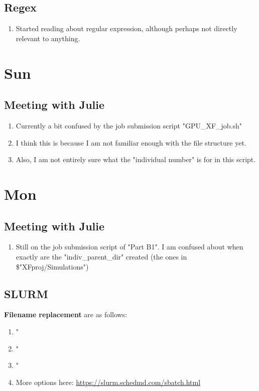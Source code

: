 \documentclass[12pt,letterpaper]{article}
\begin{document}
\subsection{Regex}
\begin{enumerate}
  \item Started reading about regular expression, although perhaps not directly relevant
    to anything.
\end{enumerate}

\section{Sun}
\subsection{Meeting with Julie}
\begin{enumerate}
  \item Currently a bit confused by the job submission script "GPU_XF_job.sh"
  \item I think this is because I am not familiar enough with the file structure yet.
  \item Also, I am not entirely sure what the "individual number" is for in this script.
\end{enumerate}

\section{Mon}
\subsection{Meeting with Julie}
\label{65S1}
\begin{enumerate}
  \item Still on the job submission script of "Part B1". I am confused about when
    exactly are the "indiv_parent_dir" created 
    (the ones in \$"XFproj/Simulations")
\end{enumerate}
\subsection{SLURM}
  \textbf{Filename replacement} are as follows:
\begin{enumerate}
  \item "%
  \item "%
  \item "%
  \item More options here: \url{https://slurm.schedmd.com/sbatch.html}
\end{enumerate}
\end{document}
